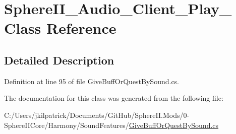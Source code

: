 \hypertarget{class_sphere_i_i___audio___client___play__1}{}\section{Sphere\+I\+I\+\_\+\+Audio\+\_\+\+Client\+\_\+\+Play\+\_ Class Reference}
\label{class_sphere_i_i___audio___client___play__1}


\subsection{Detailed Description}


Definition at line 95 of file Give\+Buff\+Or\+Quest\+By\+Sound.\+cs.



The documentation for this class was generated from the following file\+:\begin{DoxyCompactItemize}
\item 
C\+:/\+Users/jkilpatrick/\+Documents/\+Git\+Hub/\+Sphere\+I\+I.\+Mods/0-\/\+Sphere\+I\+I\+Core/\+Harmony/\+Sound\+Features/\mbox{\hyperlink{_give_buff_or_quest_by_sound_8cs}{Give\+Buff\+Or\+Quest\+By\+Sound.\+cs}}\end{DoxyCompactItemize}
